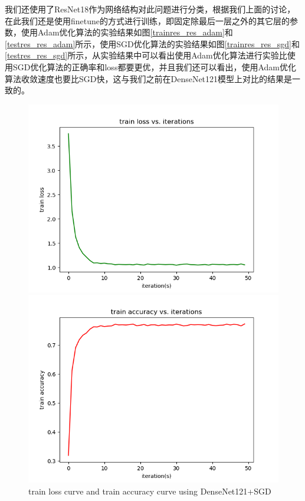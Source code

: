\documentclass[cn]{elegantbook}
\begin{document}
我们还使用了ResNet18作为网络结构对此问题进行分类，根据我们上面的讨论，在此我们还是使用finetune的方式进行训练，即固定除最后一层之外的其它层的参数，使用Adam优化算法的实验结果如图\ref{trainres_res_adam}和\ref{testres_res_adam}所示，使用SGD优化算法的实验结果如图\ref{trainres_res_sgd}和\ref{testres_res_sgd}所示，从实验结果中可以看出使用Adam优化算法进行实验比使用SGD优化算法的正确率和loss都要更优，并且我们还可以看出，使用Adam优化算法收敛速度也要比SGD快，这与我们之前在DenseNet121模型上对比的结果是一致的。
\begin{figure}[!h]
	\centering
	\begin{minipage}[t]{0.48\textwidth}
		\centering
		\includegraphics[width=\textwidth]{../results/trainloss_den}
	\end{minipage}
	\begin{minipage}[t]{0.48\textwidth}
		\centering
		\includegraphics[width=\textwidth]{../results/trainacc_den}
	\end{minipage}
	\caption{\label{trainres_den}train loss curve and train accuracy curve using DenseNet121+SGD}
\end{figure}
\end{document}

